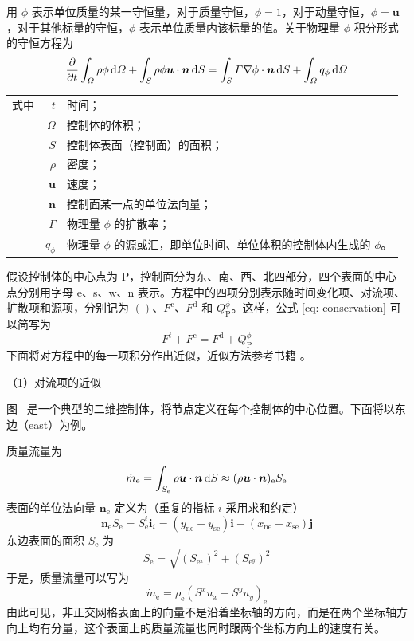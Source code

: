 用 $\phi$ 表示单位质量的某一守恒量，对于质量守恒，$\phi=1$，对于动量守恒，$\phi=\bm{u}$，对于其他标量的守恒，$\phi$ 表示单位质量内该标量的值。关于物理量 $\phi$ 积分形式的守恒方程为
\begin{equation}\label{eq: conservation}
	\frac{\partial}{\partial t}\int_{\varOmega}\rho\phi\,\mathrm{d}\varOmega +
	\int_S\rho\phi\bm{u}\cdot\bm{n}\,\mathrm{d} S =
	\int_S\varGamma\nabla\phi\cdot\bm{n}\,\mathrm{d} S +
	\int_{\varOmega}q_{\phi}\,\mathrm{d}\varOmega
\end{equation}
\begin{tabularx}{\textwidth}{@{}l@{\quad}r@{——}X@{}}
	式中 & $t$ & 时间；\\
		& $\varOmega$ & 控制体的体积；\\
		& $S$ & 控制体表面（控制面）的面积；\\
		& $\rho$ & 密度；\\
		& $\bm{u}$ & 速度；\\
		& $\bm{n}$ & 控制面某一点的单位法向量；\\
		& $\varGamma$ & 物理量 $\phi$ 的扩散率；\\
		& $q_{\phi}$ & 物理量 $\phi$ 的源或汇，即单位时间、单位体积的控制体内生成的 $\phi$。
\end{tabularx}\vspace{3.15bp}
假设控制体的中心点为 P，控制面分为东、南、西、北四部分，四个表面的中心点分别用字母 e、s、w、n 表示。方程中的四项分别表示随时间变化项、对流项、扩散项和源项，分别记为 $()$、$F^{\mathrm{c}}$、$F^{\mathrm{d}}$ 和 $Q_{\mathrm{P}}^{\phi}$。这样，公式 \eqref{eq: conservation} 可以简写为
\begin{equation}
	F^t + F^{\mathrm{c}} = F^{\mathrm{d}} + Q_{\mathrm{P}}^{\phi}
\end{equation}
下面将对方程中的每一项积分作出近似，近似方法参考书籍 。

（1）对流项的近似

图~ 是一个典型的二维控制体，将节点定义在每个控制体的中心位置。下面将以东边（east）为例。

质量流量为
\begin{equation}
	\dot m_{\mathrm{e}} = \int_{S_{\mathrm{e}}}\rho\bm{u}\cdot\bm{n}\,\mathrm{d} S \approx 
	(\rho\bm{u}\cdot\bm{n})_{\mathrm{e}} S_{\mathrm{e}}
\end{equation}
表面的单位法向量 $\bm{n}_{\mathrm{e}}$ 定义为（重复的指标 $i$ 采用求和约定）
\begin{equation}
	\bm{n}_{\mathrm{e}}S_{\mathrm{e}} = S_{\mathrm{e}}^i \bm{i}_i = 
	(y_{\mathrm{ne}}-y_{\mathrm{se}})\bm{i} - (x_{\mathrm{ne}}-x_{\mathrm{se}})\bm{j}
\end{equation}
东边表面的面积 $S_{\mathrm{e}}$ 为
\begin{equation}
	S_{\mathrm{e}} = \sqrt{(S_{\mathrm{e}^x})^2 + (S_{\mathrm{e}^y})^2}
\end{equation}
于是，质量流量可以写为
\begin{equation}
	\dot m_{\mathrm{e}} = \rho_{\mathrm{e}}(S^x u_x + S^y u_y)_{\mathrm{e}}
\end{equation}
由此可见，非正交网格表面上的向量不是沿着坐标轴的方向，而是在两个坐标轴方向上均有分量，这个表面上的质量流量也同时跟两个坐标方向上的速度有关。

